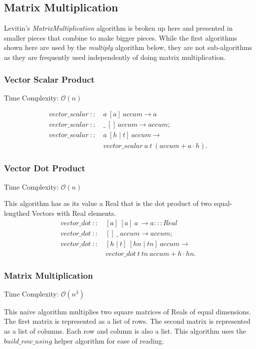 \documentclass[a4paper,10pt]{book}
\begin{document}
\subsection{Matrix Multiplication}
Levitin's \textit{MatrixMultiplication} algorithm is broken up here and presented in smaller pieces that combine to make bigger pieces. While the first algorithms shown here are used by the \textit{multiply} algorithm below, they are not sub-algorithms as they are frequently used independently of doing matrix multiplication.

\subsubsection{Vector Scalar Product}
Time Complexity: $\mathcal{O}(n)$

\begin{align*}
vector\_scalar\ ::\ &a\ [a]\ accum\rightarrow a\\
vector\_scalar\ ::\ &\_\ []\ accum\rightarrow accum;\\
vector\_scalar\ ::\ &a\ [h\mid t]\ accum\rightarrow\\
	&vector\_scalar\ a\ t\ (accum+a\cdot h).
\end{align*}

\subsubsection{Vector Dot Product}
Time Complexity: $\mathcal{O}(n)$

This algorithm has as its value a Real that is the dot product of two equal-lengthed Vectors with Real elements.
\begin{align*}
vector\_dot\ ::\ &[a]\ [a]\ a\ \rightarrow a:::Real\\
vector\_dot\ ::\ &[]\ \_\ accum\rightarrow accum;\\
vector\_dot\ ::\ &[h\mid t]\ [hn\mid tn]\ accum\rightarrow\\
	&vector\_dot\ t\ tn\ accum+h\cdot hn.
\end{align*}

\subsubsection{Matrix Multiplication}
Time Complexity: $\mathcal{O}(n^3)$

This naive algorithm multiplies two square matrices of Reals of equal dimensions. The first matrix is represented as a list of rows. The second matrix is represented as a list of columns. Each row and column is also a list. This algorithm uses the $build\_row\_using$ helper algorithm for ease of reading.
\end{document}
